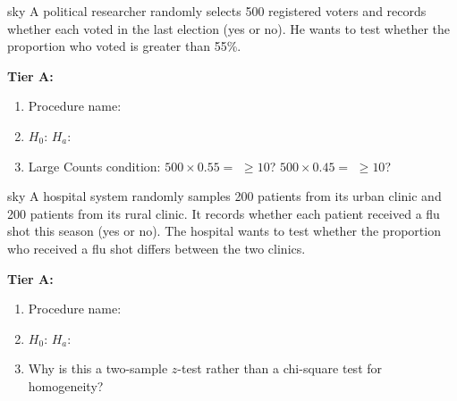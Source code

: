 \documentclass[10pt]{article}
\begin{document}
\begin{scenariobox}{sky}
A political researcher randomly selects 500 registered voters and records whether each voted
in the last election (yes or no). He wants to test whether the proportion who voted is
greater than 55\%.

\textbf{Tier A:}
\begin{enumerate}
  \item Procedure name: 
  \item $H_0$:  \quad $H_a$: 
  \item Large Counts condition: $500 \times 0.55 =$  $\ge 10$?  \quad
        $500 \times 0.45 =$  $\ge 10$? 
\end{enumerate}
\end{scenariobox}

\begin{scenariobox}{sky}
A hospital system randomly samples 200 patients from its urban clinic and 200 patients from
its rural clinic. It records whether each patient received a flu shot this season (yes or no).
The hospital wants to test whether the proportion who received a flu shot differs between the
two clinics.

\textbf{Tier A:}
\begin{enumerate}
  \item Procedure name: 
  \item $H_0$:  \quad $H_a$: 
  \item Why is this a two-sample $z$-test rather than a chi-square test for homogeneity?
         \ansline{}
\end{enumerate}
\end{scenariobox}
\end{document}
